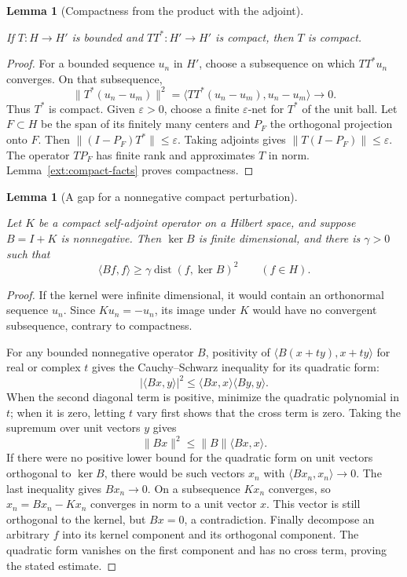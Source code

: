 \documentclass[11pt]{amsart}
\newtheorem{lemma}[theorem]{Lemma}
\theoremstyle{definition}
\theoremstyle{remark}
\numberwithin{equation}{section}
\providecommand{\lean}[1]{}
\providecommand{\leanok}{}
\begin{document}
\begin{lemma}[Compactness from the product with the adjoint]
\label{ext:ttstar}
\lean{Auto.ext_ttstar}
\leanok
If $T:H\to H'$ is bounded and $TT^*:H'\to H'$ is compact,
then $T$ is compact.
\end{lemma}
\begin{proof}
For a bounded sequence $u_n$ in $H'$, choose a subsequence on
which $TT^*u_n$ converges.  On that subsequence,
\[
 \|T^*(u_n-u_m)\|^2
 =\langle TT^*(u_n-u_m),u_n-u_m\rangle\longrightarrow0.
\]
Thus $T^*$ is compact.  Given $\varepsilon>0$, choose a finite
$\varepsilon$-net for $T^*$ of the unit ball.  Let $F\subset H$
be the span of its finitely many centers and $P_F$ the orthogonal
projection onto $F$.  Then
$\|(I-P_F)T^*\|\le\varepsilon$.  Taking adjoints gives
$\|T(I-P_F)\|\le\varepsilon$.  The operator $TP_F$ has finite
rank and approximates $T$ in norm.  Lemma~\ref{ext:compact-facts}
proves compactness.
\end{proof}

\begin{lemma}[A gap for a nonnegative compact perturbation]
\label{ext:compact-gap}
\lean{Auto.ext_compact_gap_ker,Auto.ext_compact_gap}
\leanok
Let $K$ be a compact self-adjoint operator on a Hilbert space,
and suppose $B=I+K$ is nonnegative.  Then $\ker B$ is finite
dimensional, and there is $\gamma>0$ such that
\[
 \langle Bf,f\rangle\ge
       \gamma\operatorname{dist}(f,\ker B)^2
       \qquad(f\in H).
\]
\end{lemma}
\begin{proof}
If the kernel were infinite dimensional, it would contain an
orthonormal sequence $u_n$.  Since $Ku_n=-u_n$, its image under
$K$ would have no convergent subsequence, contrary to compactness.

For any bounded nonnegative operator $B$, positivity of
$\langle B(x+ty),x+ty\rangle$ for real or complex $t$ gives
the Cauchy--Schwarz inequality for its quadratic form:
\[
 |\langle Bx,y\rangle|^2
       \le\langle Bx,x\rangle\langle By,y\rangle.
\]
When the second diagonal term is positive, minimize the
quadratic polynomial in $t$; when it is zero, letting $t$
vary first shows that the cross term is zero.  Taking the
supremum over unit vectors $y$ gives
\[
 \|Bx\|^2\le\|B\|\langle Bx,x\rangle.
\]
If there were no positive lower bound for the quadratic form
on unit vectors orthogonal to $\ker B$, there would be such
vectors $x_n$ with $\langle Bx_n,x_n\rangle\to0$.  The last
inequality gives $Bx_n\to0$.  On a subsequence $Kx_n$ converges,
so $x_n=Bx_n-Kx_n$ converges in norm to a unit vector $x$.
This vector is still orthogonal to the kernel, but $Bx=0$,
a contradiction.  Finally decompose an arbitrary $f$ into
its kernel component and its orthogonal component.  The
quadratic form vanishes on the first component and has no
cross term, proving the stated estimate.
\end{proof}
\end{document}
